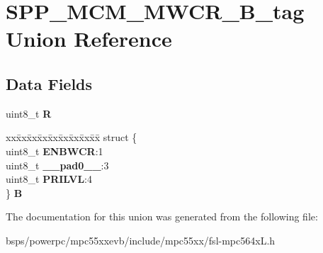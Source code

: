 \hypertarget{unionSPP__MCM__MWCR__8B__tag}{}\section{S\+P\+P\+\_\+\+M\+C\+M\+\_\+\+M\+W\+C\+R\+\_\+B\+\_\+tag Union Reference}
\label{unionSPP__MCM__MWCR__8B__tag}
\subsection*{Data Fields}
\begin{DoxyCompactItemize}
\item 
\mbox{\label{unionSPP__MCM__MWCR__8B__tag_a0e44fc18465f982fedec420bd7c68f2a}} 
uint8\+\_\+t {\bfseries R}
\item 
\mbox{\label{unionSPP__MCM__MWCR__8B__tag_a6e7a47d1120847ff657acb12d6988f92}} 
\begin{tabbing}
xx\=xx\=xx\=xx\=xx\=xx\=xx\=xx\=xx\=\kill
struct \{\\
\>uint8\_t {\bfseries ENBWCR}:1\\
\>uint8\_t {\bfseries \_\_pad0\_\_}:3\\
\>uint8\_t {\bfseries PRILVL}:4\\
\} {\bfseries B}\\

\end{tabbing}\end{DoxyCompactItemize}


The documentation for this union was generated from the following file\+:\begin{DoxyCompactItemize}
\item 
bsps/powerpc/mpc55xxevb/include/mpc55xx/fsl-\/mpc564x\+L.\+h\end{DoxyCompactItemize}
